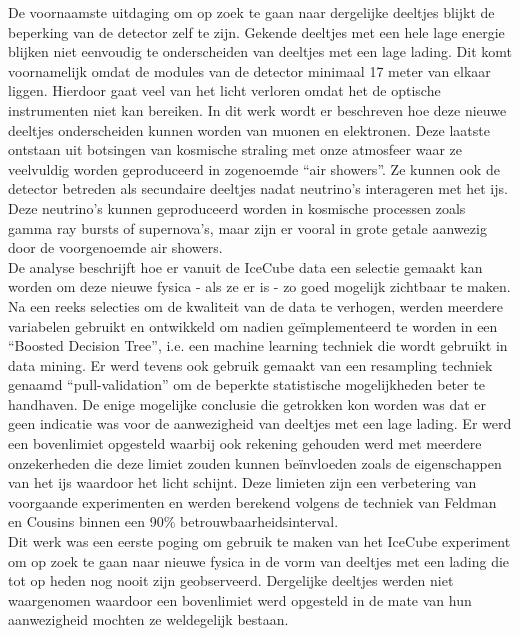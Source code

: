 \noindent De voornaamste uitdaging om op zoek te gaan naar dergelijke deeltjes blijkt de beperking van de detector zelf te zijn. Gekende deeltjes met een hele lage energie blijken niet eenvoudig te onderscheiden van deeltjes met een lage lading. Dit komt voornamelijk omdat de modules van de detector minimaal 17 meter van elkaar liggen. Hierdoor gaat veel van het licht verloren omdat het de optische instrumenten niet kan bereiken. In dit werk wordt er beschreven hoe deze nieuwe deeltjes onderscheiden kunnen worden van muonen en elektronen. Deze laatste ontstaan uit botsingen van kosmische straling met onze atmosfeer waar ze veelvuldig worden geproduceerd in zogenoemde ``air showers''. Ze kunnen ook de detector betreden als secundaire deeltjes nadat neutrino's interageren met het ijs. Deze neutrino's kunnen geproduceerd worden in kosmische processen zoals gamma ray bursts of supernova's, maar zijn er vooral in grote getale aanwezig door de voorgenoemde air showers.\\

\noindent De analyse beschrijft hoe er vanuit de IceCube data een selectie gemaakt kan worden om deze nieuwe fysica - als ze er is - zo goed mogelijk zichtbaar te maken. Na een reeks selecties om de kwaliteit van de data te verhogen, werden meerdere variabelen gebruikt en ontwikkeld om nadien ge\"implementeerd te worden in een ``Boosted Decision Tree'', i.e. een machine learning techniek die wordt gebruikt in data mining. Er werd tevens ook gebruik gemaakt van een resampling techniek genaamd ``pull-validation'' om de beperkte statistische mogelijkheden beter te handhaven. De enige mogelijke conclusie die getrokken kon worden was dat er geen indicatie was voor de aanwezigheid van deeltjes met een lage lading. Er werd een bovenlimiet opgesteld waarbij ook rekening gehouden werd met meerdere onzekerheden die deze limiet zouden kunnen be\"invloeden zoals de eigenschappen van het ijs waardoor het licht schijnt. Deze limieten zijn een verbetering van voorgaande experimenten en werden berekend volgens de techniek van Feldman en Cousins binnen een 90\% betrouwbaarheidsinterval.\\

\noindent Dit werk was een eerste poging om gebruik te maken van het IceCube experiment om op zoek te gaan naar nieuwe fysica in de vorm van deeltjes met een lading die tot op heden nog nooit zijn geobserveerd. Dergelijke deeltjes werden niet waargenomen waardoor een bovenlimiet werd opgesteld in de mate van hun aanwezigheid mochten ze weldegelijk bestaan.